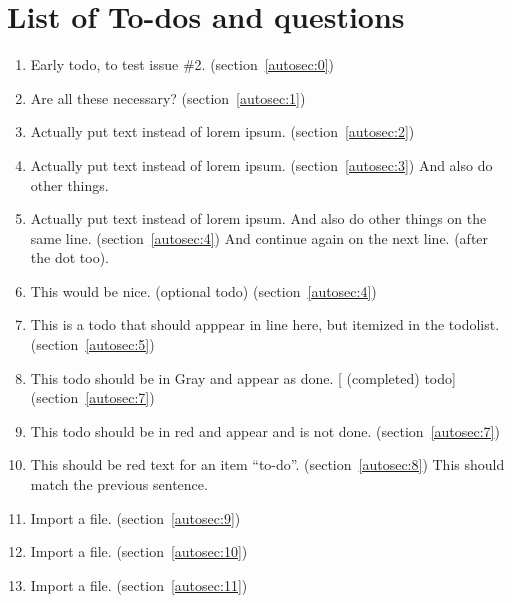 \section{List of To-dos and questions}
    \begin{enumerate}[noitemsep]
        \item {\color{red}Early todo, to test issue \#2.} (section~\ref{autosec:0})
        \item {\color{ForestGreen}Are all these necessary?} (section~\ref{autosec:1})
        \item {\color{red}Actually put text instead of lorem ipsum.} (section~\ref{autosec:2})
        \item {\color{red}Actually put text instead of lorem ipsum.} (section~\ref{autosec:3})
{\color{red}And also do other things.}
        \item {\color{red}Actually put text instead of lorem ipsum. And also do other things on the same line.} (section~\ref{autosec:4})
{\color{red}And continue again on the next line. (after the dot too).}
        \item {\color{Orange}This would be nice. (optional todo)} (section~\ref{autosec:4})
        \item {\color{red}This is a todo that should apppear in line here, but itemized in the todolist.} (section~\ref{autosec:5})
        \item {\color{Gray}This todo should be in Gray and appear as done. [ (completed) todo]} (section~\ref{autosec:7})
        \item {\color{red}This todo should be in red and appear and is not done.} (section~\ref{autosec:7})
        \item {\color{red}This should be red text for an item ``to-do''.} (section~\ref{autosec:8})
{\color{red}This should match the previous sentence.}
        \item {\color{red}Import a file.} (section~\ref{autosec:9})
        \item {\color{red}Import a file.} (section~\ref{autosec:10})
        \item {\color{red}Import a file.} (section~\ref{autosec:11})
    \end{enumerate}

